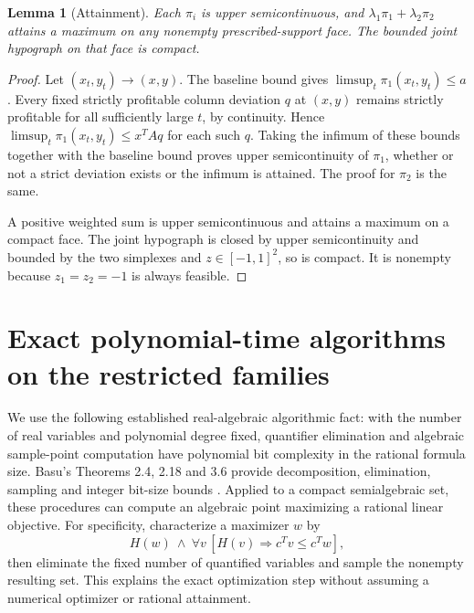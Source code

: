 \documentclass[11pt]{article}
\newtheorem{lemma}[theorem]{Lemma}
\theoremstyle{remark}
\begin{document}
\begin{lemma}[Attainment]\label{lem:attainment}
Each $\pi_i$ is upper semicontinuous, and $\lambda_1\pi_1+\lambda_2\pi_2$ attains a maximum on any nonempty prescribed-support face. The bounded joint hypograph on that face is compact.
\end{lemma}
\begin{proof}
Let $(x_t,y_t)\to(x,y)$. The baseline bound gives
$\limsup_t\pi_1(x_t,y_t)\le a$.
Every fixed strictly profitable column deviation $q$ at $(x,y)$ remains strictly profitable for all sufficiently large $t$, by continuity. Hence
$\limsup_t\pi_1(x_t,y_t)\le x^TAq$ for each such $q$.
Taking the infimum of these bounds together with the baseline bound proves upper semicontinuity of $\pi_1$, whether or not a strict deviation exists or the infimum is attained. The proof for $\pi_2$ is the same.

A positive weighted sum is upper semicontinuous and attains a maximum on a compact face. The joint hypograph is closed by upper semicontinuity and bounded by the two simplexes and $z\in[-1,1]^2$, so is compact. It is nonempty because $z_1=z_2=-1$ is always feasible.
\end{proof}

\section{Exact polynomial-time algorithms on the restricted families}
We use the following established real-algebraic algorithmic fact: with the number of real variables and polynomial degree fixed, quantifier elimination and algebraic sample-point computation have polynomial bit complexity in the rational formula size. Basu's Theorems 2.4, 2.18 and 3.6 provide decomposition, elimination, sampling and integer bit-size bounds \cite{basu}. Applied to a compact semialgebraic set, these procedures can compute an algebraic point maximizing a rational linear objective. For specificity, characterize a maximizer $w$ by
\[
 H(w)\ \wedge\ \forall v\,[H(v)\Longrightarrow c^Tv\le c^Tw],
\]
then eliminate the fixed number of quantified variables and sample the nonempty resulting set. This explains the exact optimization step without assuming a numerical optimizer or rational attainment.
\end{document}
